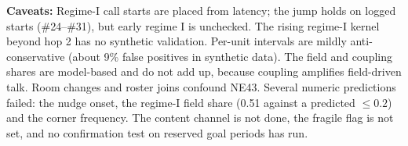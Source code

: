 \textbf{Caveats:}
Regime-I call starts are placed from latency; the jump holds on logged starts (\#24--\#31), but early regime I is unchecked.
The rising regime-I kernel beyond hop 2 has no synthetic validation.
Per-unit intervals are mildly anti-conservative (about 9\% false positives in synthetic data).
The field and coupling shares are model-based and do not add up, because coupling amplifies field-driven talk.
Room changes and roster joins confound NE43.
Several numeric predictions failed: the nudge onset, the regime-I field share (0.51 against a predicted $\le0.2$) and the corner frequency.
The content channel is not done, the fragile flag is not set, and no confirmation test on reserved goal periods has run.
